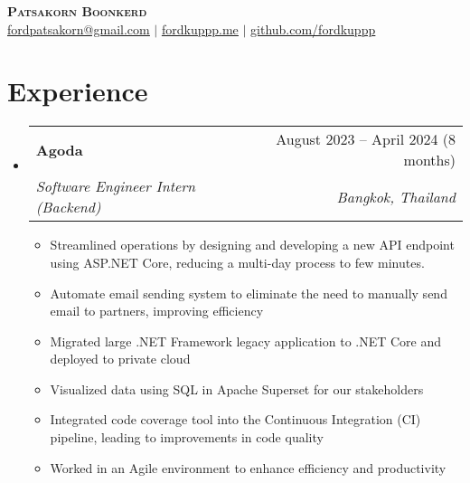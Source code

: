 \documentclass[letterpaper,11pt]{article}
\makeatletter
\newcommand{\resumeItem}[1]{
  \item\small{
    {#1 \vspace{-2pt}}
  }
}
\newcommand{\resumeSubheading}[4]{
  \vspace{-2pt}\item
    \begin{tabular*}{0.97\textwidth}[t]{l@{\extracolsep{\fill}}r}
      \textbf{#1} & #2 \\
      \textit{\small#3} & \textit{\small #4} \\
    \end{tabular*}\vspace{-7pt}
}
\newcommand{\resumeSubHeadingListStart}{\begin{itemize}[leftmargin=0.15in, label={}]}
\newcommand{\resumeSubHeadingListEnd}{\end{itemize}}
\newcommand{\resumeItemListStart}{\begin{itemize}}
\newcommand{\resumeItemListEnd}{\end{itemize}\vspace{-5pt}}
\makeatother
\begin{document}

\begin{center}
    \textbf{\Huge \scshape Patsakorn Boonkerd} \\ \vspace{1pt}
    \footnotesize{
       \href{mailto:fordpatsakorn@gmail.com}{\underline{fordpatsakorn@gmail.com}} $|$ 
       \href{https://fordkuppp.me/}{\underline{fordkuppp.me}} $|$ 
       \href{https://github.com/fordkuppp}{\underline{github.com/fordkuppp}}
    }
\end{center}


\section{Experience}
  \resumeSubHeadingListStart
    \resumeSubheading
      {Agoda}{August 2023 -- April 2024 (8 months)}
      {Software Engineer Intern (Backend)}{Bangkok, Thailand}
      \resumeItemListStart
        \resumeItem{Streamlined operations by designing and developing a new API endpoint using ASP.NET Core, reducing a multi-day process to few minutes.}
        \resumeItem{Automate email sending system to eliminate the need to manually send email to partners, improving efficiency}
        \resumeItem{Migrated large .NET Framework legacy application to .NET Core and deployed to private cloud}
        \resumeItem{Visualized data using SQL in Apache Superset for our stakeholders}
        \resumeItem{Integrated code coverage tool into the Continuous Integration (CI) pipeline, leading to improvements in code quality}
        \resumeItem{Worked in an Agile environment to enhance efficiency and productivity}

      \resumeItemListEnd
  \resumeSubHeadingListEnd

\end{document}
